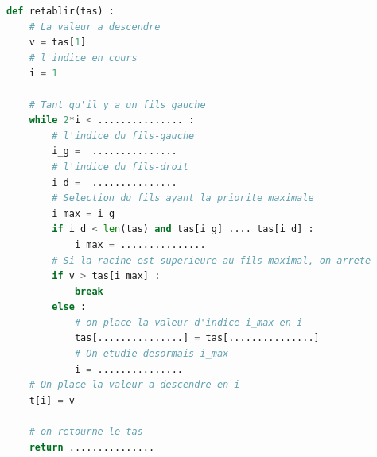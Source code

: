 \documentclass[a4paper, 11pt]{article}
\begin{document}
\begin{lstlisting}[style=stylepython, language=Python]
def retablir(tas) :
	# La valeur a descendre
	v = tas[1]
	# l'indice en cours
	i = 1

	# Tant qu'il y a un fils gauche
	while 2*i < ............... :
		# l'indice du fils-gauche 
		i_g =  ...............
		# l'indice du fils-droit
		i_d =  ...............
		# Selection du fils ayant la priorite maximale
		i_max = i_g
		if i_d < len(tas) and tas[i_g] .... tas[i_d] :
			i_max = ...............
		# Si la racine est superieure au fils maximal, on arrete
		if v > tas[i_max] :
			break
		else :
			# on place la valeur d'indice i_max en i
			tas[...............] = tas[...............]
			# On etudie desormais i_max
			i = ...............
	# On place la valeur a descendre en i
	t[i] = v

	# on retourne le tas
	return ...............
\end{lstlisting}
\end{document}
